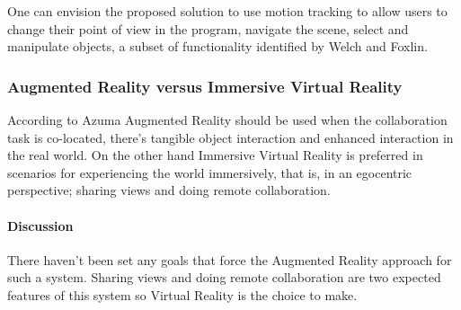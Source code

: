 One can envision the proposed solution to use motion tracking to allow users to change their
point of view in the program, navigate the scene, select and manipulate objects, a subset
of functionality identified by Welch and Foxlin.

\subsubsection{Augmented Reality versus Immersive Virtual Reality}

According to Azuma \cite{OVERVIEW-AR} Augmented Reality should be used
when the collaboration task is co-located,
there's tangible object interaction and
enhanced interaction in the real world.
On the other hand Immersive Virtual Reality is preferred in scenarios for
experiencing the world immersively, that is, in an egocentric perspective;
sharing views and
doing remote collaboration.


\paragraph{Discussion}
There haven't been set any goals that force the Augmented Reality approach for such a system.
Sharing views and doing remote collaboration are two expected features of this system so
Virtual Reality is the choice to make.


%
